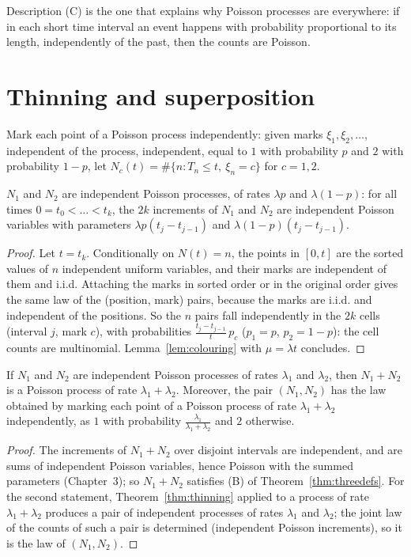 Description (C) is the one that explains why Poisson processes are everywhere: if in each short time interval an event
happens with probability proportional to its length, independently of the past, then the counts are Poisson.

\section{Thinning and superposition}

Mark each point of a Poisson process independently: given marks $\xi_1,\xi_2,\ldots$, independent of the process, independent, equal to $1$ with
probability $p$ and $2$ with probability $1-p$, let $N_c(t)=\#\{n:T_n\le t,\ \xi_n=c\}$ for $c=1,2$.

\begin{theorem}[thinning]\label{thm:thinning}
$N_1$ and $N_2$ are independent Poisson processes, of rates $\lambda p$ and $\lambda(1-p)$: for all times $0=t_0<\dots<t_k$, the $2k$ increments of $N_1$ and $N_2$ are
independent Poisson variables with parameters $\lambda p(t_j-t_{j-1})$ and $\lambda(1-p)(t_j-t_{j-1})$.
\end{theorem}
\begin{proof}
Let $t=t_k$. Conditionally on $N(t)=n$, the points in $[0,t]$ are the sorted values of $n$ independent uniform variables, and their marks are
independent of them and i.i.d. Attaching the marks in sorted order or in the original order gives the same law of the
(position, mark) pairs, because the marks are i.i.d. and independent of the positions. So the $n$ pairs fall independently in the $2k$
cells (interval $j$, mark $c$), with probabilities $\frac{t_j-t_{j-1}}t\,p_c$ ($p_1=p$, $p_2=1-p$): the cell counts are multinomial. Lemma~\ref{lem:colouring} with $\mu=\lambda t$ concludes.
\end{proof}

\begin{corollary}[superposition]\label{cor:superposition}
If $N_1$ and $N_2$ are independent Poisson processes of rates $\lambda_1$ and $\lambda_2$, then $N_1+N_2$ is a Poisson process of rate $\lambda_1+\lambda_2$. Moreover, the
pair $(N_1,N_2)$ has the law obtained by marking each point of a Poisson process of rate $\lambda_1+\lambda_2$ independently, as $1$ with probability
$\frac{\lambda_1}{\lambda_1+\lambda_2}$ and $2$ otherwise.
\end{corollary}
\begin{proof}
The increments of $N_1+N_2$ over disjoint intervals are independent, and are sums of independent Poisson variables, hence Poisson
with the summed parameters (Chapter~3); so $N_1+N_2$ satisfies (B) of Theorem~\ref{thm:threedefs}. For the second statement, Theorem~\ref{thm:thinning} applied to
a process of rate $\lambda_1+\lambda_2$ produces a pair of independent processes of rates $\lambda_1$ and $\lambda_2$; the joint law of the counts of such a pair is
determined (independent Poisson increments), so it is the law of $(N_1,N_2)$.
\end{proof}


